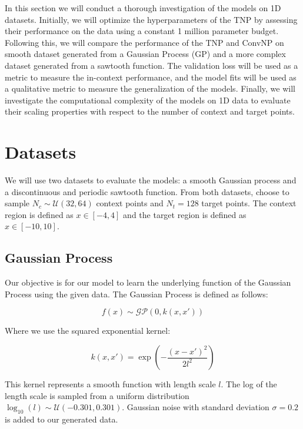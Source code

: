 \documentclass[../../main.tex]{subfiles}
\begin{document}
In this section we will conduct a thorough investigation of the models on 1D datasets. Initially, we will optimize the hyperparameters of the TNP by assessing their performance on the data using a constant 1 million parameter budget. Following this, we will compare the performance of the TNP and ConvNP on smooth dataset generated from a Gaussian Process (GP) \parencite{books/lib/RasmussenW06} and a more complex dataset generated from a sawtooth function. The validation loss will be used as a metric to measure the in-context performance, and the model fits will be used as a qualitative metric to measure the generalization of the models. Finally, we will investigate the computational complexity of the models on 1D data to evaluate their scaling properties with respect to the number of context and target points.

\section{Datasets}

We will use two datasets to evaluate the models: a smooth Gaussian process and a discontinuous and periodic sawtooth function. From both datasets, choose to sample $N_c \sim \mathcal{U}(32, 64)$ context points and $N_t = 128$ target points. The context region is defined as $x \in [-4, 4]$ and the target region is defined as $x \in [-10, 10]$. 

\subsection{Gaussian Process}
\label{sec:1d-gp-dataset}

 Our objective is for our model to learn the underlying function of the Gaussian Process using the given data. The Gaussian Process is defined as follows:

\begin{equation}
	f(x) \sim \mathcal{GP}(0, k(x, x'))
\end{equation}

Where we use the squared exponential kernel:

\begin{equation}
	k(x, x') = \exp\left(-\frac{(x - x')^2}{2l^2}\right)
\end{equation}

This kernel represents a smooth function with length scale $l$. The log of the length scale is sampled from a uniform distribution $\log_{10}(l) \sim \mathcal{U}(-0.301, 0.301)$. Gaussian noise with standard deviation $\sigma = 0.2$ is added to our generated data. 
\end{document}
